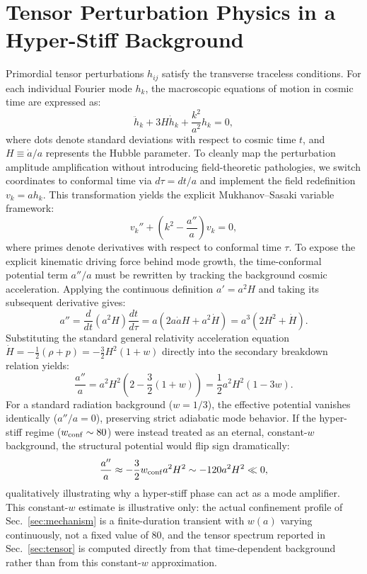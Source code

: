 \documentclass[twocolumn, PRD, amsmath, amssymb, aps, nofootinbib]{revtex4-2}
\begin{document}
\section{Tensor Perturbation Physics in a Hyper-Stiff Background}
Primordial tensor perturbations $h_{ij}$ satisfy the transverse traceless conditions. For each individual Fourier mode $h_k$, the macroscopic equations of motion in cosmic time are expressed as:
\begin{equation}
\ddot{h}_k + 3H\dot{h}_k + \frac{k^2}{a^2}h_k = 0,
\end{equation}
where dots denote standard deviations with respect to cosmic time $t$, and $H \equiv \dot{a}/a$ represents the Hubble parameter. To cleanly map the perturbation amplitude amplification without introducing field-theoretic pathologies, we switch coordinates to conformal time via $d\tau = dt/a$ and implement the field redefinition $v_k = a h_k$. This transformation yields the explicit Mukhanov--Sasaki variable framework:
\begin{equation}
v_k'' + \left(k^2 - \frac{a''}{a}\right)v_k = 0,
\end{equation}
where primes denote derivatives with respect to conformal time $\tau$. To expose the explicit kinematic driving force behind mode growth, the time-conformal potential term $a''/a$ must be rewritten by tracking the background cosmic acceleration. Applying the continuous definition $a' = a^2 H$ and taking its subsequent derivative gives:
\begin{equation}
a'' = \frac{d}{dt}(a^2 H) \frac{dt}{d\tau} = a \left( 2a\dot{a}H + a^2 \dot{H} \right) = a^3 \left( 2H^2 + \dot{H} \right).
\end{equation}
Substituting the standard general relativity acceleration equation $\dot{H} = -\frac{1}{2}(\rho + p) = -\frac{3}{2}H^2(1+w)$ directly into the secondary breakdown relation yields:
\begin{equation}
\frac{a''}{a} = a^2 H^2 \left( 2 - \frac{3}{2}(1+w) \right) = \frac{1}{2}a^2 H^2 (1 - 3w).
\end{equation}
For a standard radiation background ($w = 1/3$), the effective potential vanishes identically ($a''/a = 0$), preserving strict adiabatic mode behavior. If the hyper-stiff regime ($w_{\rm conf} \sim 80$) were instead treated as an eternal, constant-$w$ background, the structural potential would flip sign dramatically:
\begin{equation}
\frac{a''}{a} \approx -\frac{3}{2}w_{\rm conf} a^2 H^2 \sim -120 a^2 H^2 \ll 0,
\end{equation}
qualitatively illustrating why a hyper-stiff phase can act as a mode amplifier. This constant-$w$ estimate is illustrative only: the actual confinement profile of Sec.~\ref{sec:mechanism} is a finite-duration transient with $w(a)$ varying continuously, not a fixed value of 80, and the tensor spectrum reported in Sec.~\ref{sec:tensor} is computed directly from that time-dependent background rather than from this constant-$w$ approximation.
\end{document}
